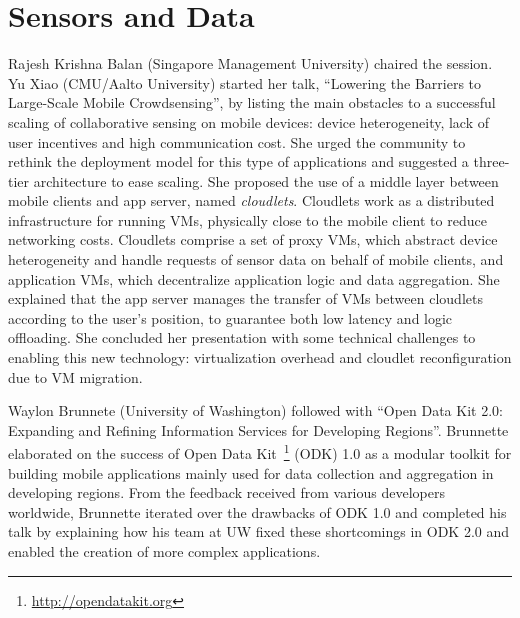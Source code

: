 \section{Sensors and Data}
\label{sec:sensors}

Rajesh Krishna Balan (Singapore Management University) chaired the
session. Yu Xiao (CMU/Aalto University) started her talk, ``Lowering the
Barriers to Large-Scale Mobile Crowdsensing'', by listing the main
obstacles to a successful scaling of collaborative sensing on mobile devices:
device heterogeneity, lack of user incentives and high communication
cost. She urged the community to rethink the deployment model for this
type of applications and suggested a three-tier architecture to ease
scaling. She proposed the use of a middle layer between mobile clients
and app server, named \emph{cloudlets}. Cloudlets work as a
distributed infrastructure for running VMs, physically close to the
mobile client to reduce networking costs. Cloudlets comprise a set of
proxy VMs, which abstract device heterogeneity and handle requests of
sensor data on behalf of mobile clients, and application VMs, which
decentralize application logic and data aggregation. She explained that
the app server manages the transfer of VMs between cloudlets according
to the user's position, to guarantee both low latency and logic
offloading. She concluded her presentation with some technical
challenges to enabling this new technology: virtualization overhead and
cloudlet reconfiguration due to VM migration.

Waylon Brunnete (University of Washington) followed with ``Open Data Kit
2.0: Expanding and Refining Information Services for Developing
Regions''. Brunnette elaborated on the success of Open Data
Kit~\footnote{\url{http://opendatakit.org}} (ODK) 1.0 as a modular
toolkit for building mobile applications mainly used for data collection
and aggregation in developing regions. From the feedback received from
various developers worldwide, Brunnette iterated over the drawbacks of
ODK 1.0 and completed his talk by explaining how his team at UW fixed
these shortcomings in ODK 2.0 and enabled the creation of more complex
applications.


